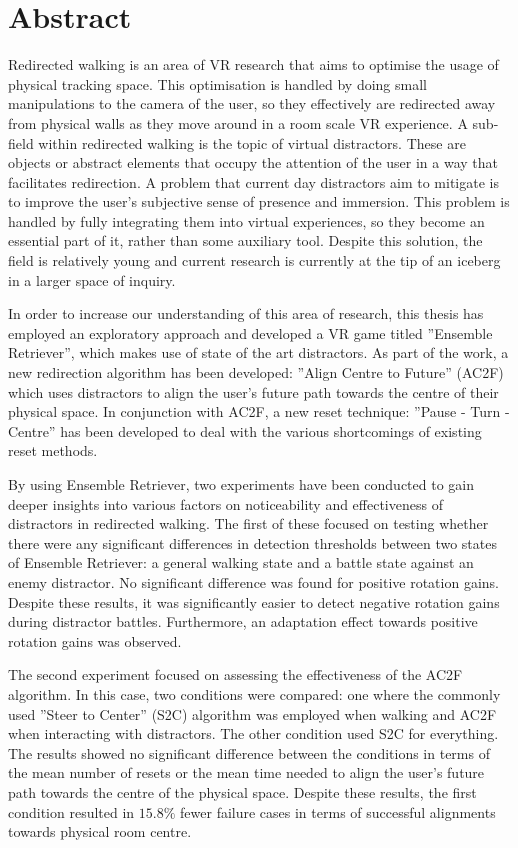 \chapter*{Abstract}
Redirected walking is an area of VR research that aims to optimise the usage of physical tracking space. This optimisation is handled by doing small manipulations to the camera of the user, so they effectively are redirected away from physical walls as they move around in a room scale VR experience.
A sub-field within redirected walking is the topic of virtual distractors. These are objects or abstract elements that occupy the attention of the user in a way that facilitates redirection. A problem that current day distractors aim to mitigate is to improve the user's subjective sense of presence and immersion. This problem is handled by fully integrating them into virtual experiences, so they become an essential part of it, rather than some auxiliary tool. Despite this solution, the field is relatively young and current research is currently at the tip of an iceberg in a larger space of inquiry. 

In order to increase our understanding of this area of research, this thesis has employed an exploratory approach and developed a VR game titled ''Ensemble Retriever'', which makes use of state of the art distractors. As part of the work, a new redirection algorithm has been developed: ''Align Centre to Future'' (AC2F) which uses distractors to align the user's future path towards the centre of their physical space. In conjunction with AC2F, a new reset technique: ''Pause - Turn - Centre'' has been developed to deal with the various shortcomings of existing reset methods. 

By using Ensemble Retriever, two experiments have been conducted to gain deeper insights into various factors on noticeability and effectiveness of distractors in redirected walking. The first of these focused on testing whether there were any significant differences in detection thresholds between two states of Ensemble Retriever: a general walking state and a battle state against an enemy distractor. No significant difference was found for positive rotation gains. Despite these results, it was significantly easier to detect negative rotation gains during distractor battles. Furthermore, an adaptation effect towards positive rotation gains was observed. 

The second experiment focused on assessing the effectiveness of the AC2F algorithm. In this case, two conditions were compared: one where the commonly used ''Steer to Center'' (S2C) algorithm was employed when walking and AC2F when interacting with distractors. The other condition used S2C for everything. The results showed no significant difference between the conditions in terms of the mean number of resets or the mean time needed to align the user's future path towards the centre of the physical space. Despite these results, the first condition resulted in $15.8\%$ fewer failure cases in terms of successful alignments towards physical room centre. 

